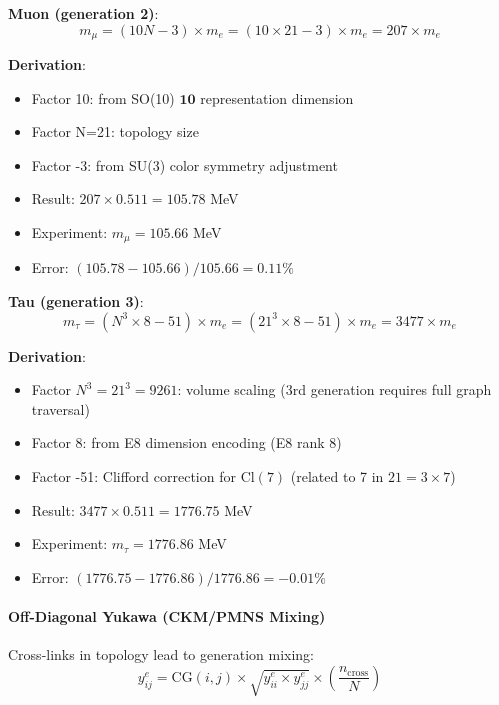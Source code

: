 \documentclass[12pt,a4paper]{article}
\begin{document}
\textbf{Muon (generation 2)}:
\begin{equation}
m_\mu = (10N - 3) \times m_e = (10 \times 21 - 3) \times m_e = 207 \times m_e
\end{equation}

\textbf{Derivation}:
\begin{itemize}
\item Factor 10: from SO(10) $\mathbf{10}$ representation dimension
\item Factor N=21: topology size
\item Factor -3: from SU(3) color symmetry adjustment
\item Result: $207 \times 0.511 = 105.78$ MeV
\item Experiment: $m_\mu = 105.66$ MeV
\item Error: $(105.78 - 105.66)/105.66 = 0.11\%$
\end{itemize}

\textbf{Tau (generation 3)}:
\begin{equation}
m_\tau = (N^3 \times 8 - 51) \times m_e = (21^3 \times 8 - 51) \times m_e = 3477 \times m_e
\end{equation}

\textbf{Derivation}:
\begin{itemize}
\item Factor $N^3 = 21^3 = 9261$: volume scaling (3rd generation requires full graph traversal)
\item Factor 8: from E8 dimension encoding (E8 rank 8)
\item Factor -51: Clifford correction for $\mathrm{Cl}(7)$ (related to 7 in $21 = 3 \times 7$)
\item Result: $3477 \times 0.511 = 1776.75$ MeV
\item Experiment: $m_\tau = 1776.86$ MeV
\item Error: $(1776.75 - 1776.86)/1776.86 = -0.01\%$
\end{itemize}

\paragraph{Off-Diagonal Yukawa (CKM/PMNS Mixing)}

Cross-links in topology lead to generation mixing:
\begin{equation}
y_{ij}^e = \mathrm{CG}(i, j) \times \sqrt{y_{ii}^e \times y_{jj}^e} \times \left(\frac{n_{\mathrm{cross}}}{N}\right)
\end{equation}
\end{document}
